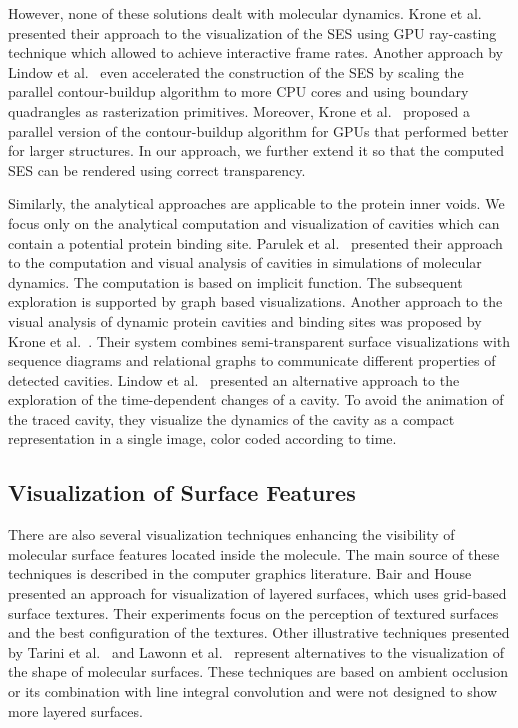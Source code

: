 However, none of these solutions dealt with molecular dynamics. 
Krone et al.~\cite{krone2009interactive} presented their approach to the visualization of the SES using GPU ray-casting technique which allowed to achieve interactive frame rates. 
Another approach by Lindow et al.~\cite{lindow2010accelerated} even accelerated the construction of the SES by scaling the parallel contour-buildup algorithm to more CPU cores and using boundary quadrangles as rasterization primitives.
Moreover, Krone et al.~\cite{krone2011parallel} proposed a parallel version of the contour-buildup algorithm for GPUs that performed better for larger structures.
In our approach, we further extend it so that the computed SES can be rendered using correct transparency.

Similarly, the analytical approaches are applicable to the protein inner voids. 
We focus only on the analytical computation and visualization of cavities which can contain a potential protein binding site.
Parulek et al.~\cite{parulek2013visual} presented their approach to the computation and visual analysis of cavities in simulations of molecular dynamics.
The computation is based on implicit function. 
The subsequent exploration is supported by graph based visualizations.
Another approach to the visual analysis of dynamic protein cavities and binding sites was proposed by Krone et al.~\cite{Krone2014}.
Their system combines semi-transparent surface visualizations with sequence diagrams and relational graphs to communicate different properties of detected cavities.
Lindow et al.~\cite{Lindow2013} presented an alternative approach to the exploration of the time-dependent changes of a cavity. 
To avoid the animation of the traced cavity, they visualize the dynamics of the cavity as a compact representation in a single image, color coded according to time. 

\subsection{Visualization of Surface Features}
There are also several visualization techniques enhancing the visibility of molecular surface features located inside the molecule. The main source of these techniques is described in the computer graphics literature. Bair and House~\cite{Bair2007} presented an approach for visualization of layered surfaces, which uses grid-based surface textures. Their experiments focus on the perception of textured surfaces and the best configuration of the textures. 
Other illustrative techniques presented by Tarini et al.~\cite{Tarini2006} and Lawonn et al.~\cite{Lawonn2014} represent alternatives to the visualization of the shape of molecular surfaces. 
These techniques are based on ambient occlusion or its combination with line integral convolution and were not designed to show more layered surfaces.

